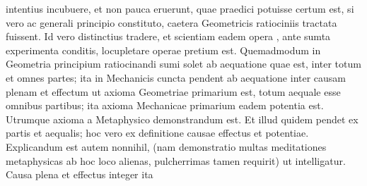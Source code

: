 \pstart 
{} intentius incubuere, et non pauca eruerunt, quae praedici potuisse certum est, si vero ac generali principio constituto, caetera Geometricis ratiociniis tractata fuissent. Id vero distinctius tradere, et scientiam eadem opera , ante sumta experimenta conditis, locupletare operae pretium est. 
\pend 
\count{}
\count{}
\pstart Quemadmodum in Geometria\protect{} principium ratiocinandi sumi solet ab aequatione quae est, inter totum et omnes partes; ita in Mechanicis cuncta pendent ab aequatione inter causam plenam et effectum  ut axioma Geometriae\protect{} primarium est, totum aequale esse omnibus partibus; ita axioma Mechanicae\protect{} primarium  eadem potentia est. Utrumque axioma a Metaphysico demonstrandum est. Et illud quidem pendet ex  partis et aequalis; hoc vero ex definitione causae effectus et potentiae\protect{}. Explicandum est autem nonnihil, (nam demonstratio multas meditationes metaphysicas ab hoc loco alienas, pulcherrimas tamen requirit) ut intelligatur. Causa plena et effectus integer ita
